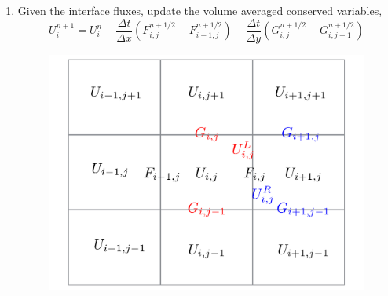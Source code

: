 \documentclass{article}
\begin{document}
\begin{enumerate}
	\item Given the interface fluxes, update the volume averaged conserved variables, 
	\begin{equation}
		U_i^{n+1} = U_i^n - \frac{\Delta t}{\Delta x} \left(F_{i,j}^{n+1/2} - F_{i-1,j}^{n+1/2} \right) - \frac{\Delta t}{\Delta y} \left(G_{i,j}^{n+1/2} - G_{i,j-1}^{n+1/2} \right)
	\end{equation}
\begin{figure}
\centering
\includegraphics[width=.8\textwidth]{2d_transverse}
\end{figure}
\end{enumerate}
\end{document}
